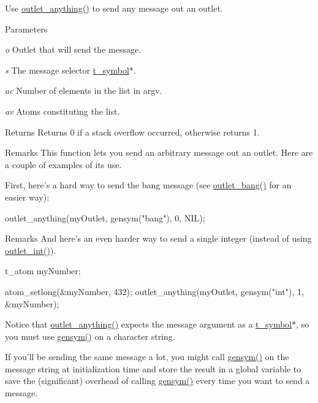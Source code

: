 Use \hyperlink{group__inout_ga12798ee897e01dac21ee547c4091d8a8}{outlet\_\-anything()} to send any message out an outlet. 
\begin{DoxyParams}{Parameters}
\item[{\em o}]Outlet that will send the message. \item[{\em s}]The message selector \hyperlink{structt__symbol}{t\_\-symbol}$\ast$. \item[{\em ac}]Number of elements in the list in argv. \item[{\em av}]Atoms constituting the list. \end{DoxyParams}
\begin{DoxyReturn}{Returns}
Returns 0 if a stack overflow occurred, otherwise returns 1.
\end{DoxyReturn}
\begin{DoxyRemark}{Remarks}
This function lets you send an arbitrary message out an outlet. Here are a couple of examples of its use.
\end{DoxyRemark}
First, here’s a hard way to send the bang message (see \hyperlink{group__inout_ga357498d7143fd266facfbfc4efa59029}{outlet\_\-bang()} for an easier way): 
\begin{DoxyCode}
    outlet_anything(myOutlet, gensym("bang"), 0, NIL); 
\end{DoxyCode}


\begin{DoxyRemark}{Remarks}
And here’s an even harder way to send a single integer (instead of using \hyperlink{group__inout_ga0b2b38216f2f4dba486bfcd2273f255e}{outlet\_\-int()}). 
\begin{DoxyCode}
    t_atom myNumber; 

    atom_setlong(&myNumber, 432);
    outlet_anything(myOutlet, gensym("int"), 1, &myNumber);
\end{DoxyCode}


Notice that \hyperlink{group__inout_ga12798ee897e01dac21ee547c4091d8a8}{outlet\_\-anything()} expects the message argument as a \hyperlink{structt__symbol}{t\_\-symbol}$\ast$, so you must use \hyperlink{group__symbol_ga8268797d125a15bae1010af70b559e05}{gensym()} on a character string.
\end{DoxyRemark}
If you’ll be sending the same message a lot, you might call \hyperlink{group__symbol_ga8268797d125a15bae1010af70b559e05}{gensym()} on the message string at initialization time and store the result in a global variable to save the (significant) overhead of calling \hyperlink{group__symbol_ga8268797d125a15bae1010af70b559e05}{gensym()} every time you want to send a message.

